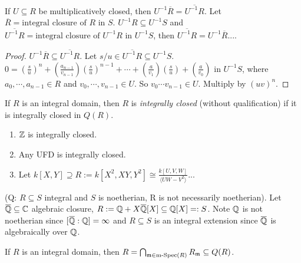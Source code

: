 \begin{proposition}
    If $U \subseteq R$ be multiplicatively closed, then $U^{-1} \overbar{R} = \overbar{U^{-1}R}$. Let $\overbar{R} = \text{integral closure of $R$ in $S$}$. $U^{-1}R \subseteq U^{-1}S$ and $\overbar{U^{-1}R} = \text{integral closure of $U^{-1}R$ in $U^{-1}S$}$, then $\overbar{U^{-1}R} = U^{-1} \overbar{R}$....
\end{proposition}

\begin{proof}
    $U^{-1} \overbar{R} \subseteq \overbar{U^{-1}R}$. Let $s/u \in \overbar{U^{-1}R} \subseteq U^{-1}S$. $0 = (\frac{s}{u})^{n} + (\frac{a_{n-1}}{v_{n-1}})(\frac{s}{u})^{n-1} + \cdots + (\frac{a}{v_1})(\frac{s}{u}) + (\frac{a}{v_0})$ in $U^{-1}S$, where $a_0,\cdots,a_{n-1} \in R$ and $v_0,\cdots,v_{n-1} \in U$. So $v_0 \cdots v_{n-1} \in U$. Multiply by $(uv)^{n}$.
\end{proof}

\begin{definition}
    If $R$ is an integral domain, then $R$ is \emph{integrally closed} (without qualification) if it is integrally closed in $Q(R)$. 
\end{definition}

\begin{example}
    \begin{enumerate}
        \item $\mathbb{Z}$ is integrally closed.
        \item Any UFD is integrally closed.
        \item Let $k[X,Y] \supseteq R := k[X^{2},XY,Y^{2}] \cong \frac{k[U,V,W]}{\langle UW-V^{2} \rangle}$...
    \end{enumerate}
\end{example}

\begin{example}
    (Q: $R \subseteq S$ integral and $S$ is noetherian, R is not necessarily noetherian). Let $\overbar{\bbQ} \subseteq \bbC$ algebraic closure, $R := \bbQ + X \overbar{\bbQ}[X] \subseteq \bbQ[X] =: S$. Note $\mathbb{Q}$ is not noetherian since $[\overbar{\bbQ}:\bbQ] = \infty$ and $R \subseteq S$ is an integral extension since $\overbar{\bbQ}$ is algebraically over $\mathbb{Q}$.
\end{example}

\begin{lemma}
    If $R$ is an integral domain, then $R = \bigcap_{\mathfrak{m} \in \operatorname{m-Spec}(R)} R_{\mathfrak{m}} \subseteq Q(R)$. 
\end{lemma}

